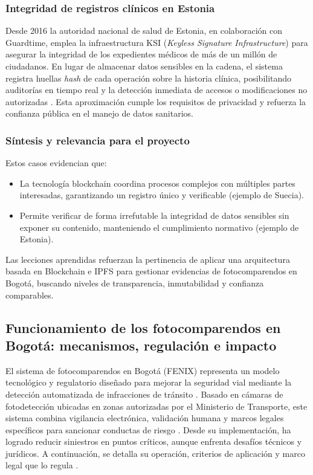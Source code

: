 \subsubsection{Integridad de registros clínicos en Estonia}

Desde 2016 la autoridad nacional de salud de Estonia, en colaboración con Guardtime, emplea la infraestructura KSI (\textit{Keyless Signature Infrastructure}) para asegurar la integridad de los expedientes médicos de más de un millón de ciudadanos. En lugar de almacenar datos sensibles en la cadena, el sistema registra huellas \textit{hash} de cada operación sobre la historia clínica, posibilitando auditorías en tiempo real y la detección inmediata de accesos o modificaciones no autorizadas \parencite{guardtime2016,reddit_estonia_blockchain}. Esta aproximación cumple los requisitos de privacidad y refuerza la confianza pública en el manejo de datos sanitarios.

\subsubsection{Síntesis y relevancia para el proyecto}

Estos casos evidencian que:
\begin{itemize}
  \item La tecnología blockchain coordina procesos complejos con múltiples partes interesadas, garantizando un registro único y verificable (ejemplo de Suecia).
  \item Permite verificar de forma irrefutable la integridad de datos sensibles sin exponer su contenido, manteniendo el cumplimiento normativo (ejemplo de Estonia).
\end{itemize}

Las lecciones aprendidas refuerzan la pertinencia de aplicar una arquitectura basada en Blockchain e IPFS para gestionar evidencias de fotocomparendos en Bogotá, buscando niveles de transparencia, inmutabilidad y confianza comparables.


\subsection{Funcionamiento de los fotocomparendos en Bogotá: mecanismos, regulación e impacto} 
El sistema de fotocomparendos en Bogotá (FENIX) representa un modelo tecnológico y regulatorio diseñado para mejorar la seguridad vial mediante la detección automatizada de infracciones de tránsito \parencite{mintransporte2023}. Basado en cámaras de fotodetección ubicadas en zonas autorizadas por el Ministerio de Transporte, este sistema combina vigilancia electrónica, validación humana y marcos legales específicos para sancionar conductas de riesgo \parencite{supertransporte2021}. Desde su implementación, ha logrado reducir siniestros en puntos críticos, aunque enfrenta desafíos técnicos y jurídicos. A continuación, se detalla su operación, criterios de aplicación y marco legal que lo regula \parencite{mintransporte2023}.

